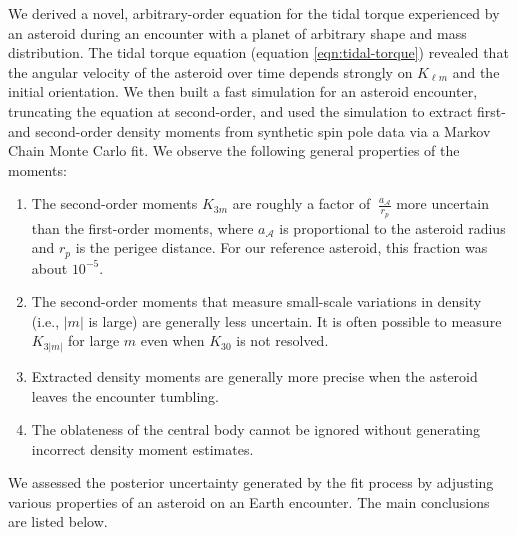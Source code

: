 \documentclass[fleqn,usenatbib]{mnras}
\begin{document}
We derived a novel, arbitrary-order equation for the tidal torque experienced by an asteroid during an encounter with a planet of arbitrary shape and mass distribution. The tidal torque equation (equation \ref{eqn:tidal-torque}) revealed that the angular velocity of the asteroid over time depends strongly on $K_{\ell m}$ and the initial orientation. We then built a fast simulation for an asteroid encounter, truncating the equation at second-order, and used the simulation to extract first- and second-order density moments from synthetic spin pole data via a Markov Chain Monte Carlo fit. We observe the following general properties of the moments:
\begin{enumerate}
  \item The second-order moments $K_{3m}$ are roughly a factor of $~\frac{a_\mathcal{A}}{r_p}$ more uncertain than the first-order moments, where $a_\mathcal{A}$ is proportional to the asteroid radius and $r_p$ is the perigee distance. For our reference asteroid, this fraction was about $10^{-5}$.
  \item The second-order moments that measure small-scale variations in density (i.e., $|m|$ is large) are generally less uncertain. It is often possible to measure $K_{3|m|}$ for large $m$ even when $K_{30}$ is not resolved.
  \item Extracted density moments are generally more precise when the asteroid leaves the encounter tumbling.
  \item The oblateness of the central body cannot be ignored without generating incorrect density moment estimates.
\end{enumerate}

We assessed the posterior uncertainty generated by the fit process by adjusting various properties of an asteroid on an Earth encounter. The main conclusions are listed below.
\end{document}
